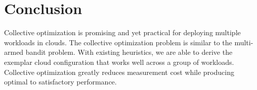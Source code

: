 \section{Conclusion}
\label{sec:conclusion}
Collective optimization is promising and yet practical for deploying multiple workloads in clouds.
The collective optimization problem is similar to the multi-armed bandit problem.
With existing heuristics, we are able to derive the exemplar cloud configuration that works well across a group of workloads. Collective optimization greatly reduces measurement cost while producing optimal to satisfactory performance.